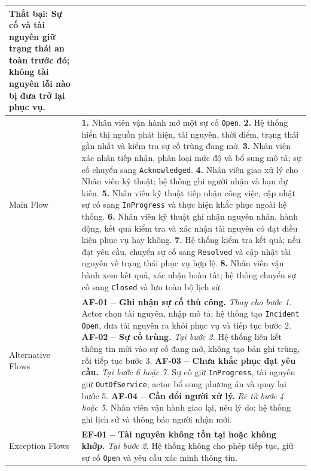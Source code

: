 \begin{longtable}{|L{42mm}|L{102mm}|}
    \textbf{Thất bại:} Sự cố và tài nguyên giữ trạng thái an toàn trước đó; không tài nguyên lỗi nào bị đưa trở lại phục vụ.\\\hline
  Main Flow &
    \textbf{1.} Nhân viên vận hành mở một sự cố \texttt{Open}.\newline
    \textbf{2.} Hệ thống hiển thị nguồn phát hiện, tài nguyên, thời điểm, trạng thái gần nhất và kiểm tra sự cố trùng đang mở.\newline
    \textbf{3.} Nhân viên xác nhận tiếp nhận, phân loại mức độ và bổ sung mô tả; sự cố chuyển sang \texttt{Acknowledged}.\newline
    \textbf{4.} Nhân viên giao xử lý cho Nhân viên kỹ thuật; hệ thống ghi người nhận và hạn dự kiến.\newline
    \textbf{5.} Nhân viên kỹ thuật tiếp nhận công việc, cập nhật sự cố sang \texttt{InProgress} và thực hiện khắc phục ngoài hệ thống.\newline
    \textbf{6.} Nhân viên kỹ thuật ghi nhận nguyên nhân, hành động, kết quả kiểm tra và xác nhận tài nguyên có đạt điều kiện phục vụ hay không.\newline
    \textbf{7.} Hệ thống kiểm tra kết quả; nếu đạt yêu cầu, chuyển sự cố sang \texttt{Resolved} và cập nhật tài nguyên về trạng thái phục vụ hợp lệ.\newline
    \textbf{8.} Nhân viên vận hành xem kết quả, xác nhận hoàn tất; hệ thống chuyển sự cố sang \texttt{Closed} và lưu toàn bộ lịch sử.\\\hline
  Alternative Flows &
    \textbf{AF-01 -- Ghi nhận sự cố thủ công.} \textit{Thay cho bước 1.} Actor chọn tài nguyên, nhập mô tả; hệ thống tạo \texttt{Incident} \texttt{Open}, đưa tài nguyên ra khỏi phục vụ và tiếp tục bước 2.\newline
    \textbf{AF-02 -- Sự cố trùng.} \textit{Tại bước 2.} Hệ thống liên kết thông tin mới vào sự cố đang mở, không tạo bản ghi trùng, rồi tiếp tục bước 3.\newline
    \textbf{AF-03 -- Chưa khắc phục đạt yêu cầu.} \textit{Tại bước 6 hoặc 7.} Sự cố giữ \texttt{InProgress}, tài nguyên giữ \texttt{OutOfService}; actor bổ sung phương án và quay lại bước 5.\newline
    \textbf{AF-04 -- Cần đổi người xử lý.} \textit{Rẽ từ bước 4 hoặc 5.} Nhân viên vận hành giao lại, nêu lý do; hệ thống ghi lịch sử và thông báo người nhận mới.\\\hline
  Exception Flows &
    \textbf{EF-01 -- Tài nguyên không tồn tại hoặc không khớp.} \textit{Tại bước 2.} Hệ thống không cho phép tiếp tục, giữ sự cố \texttt{Open} và yêu cầu xác minh thông tin.\newline

\end{longtable}
